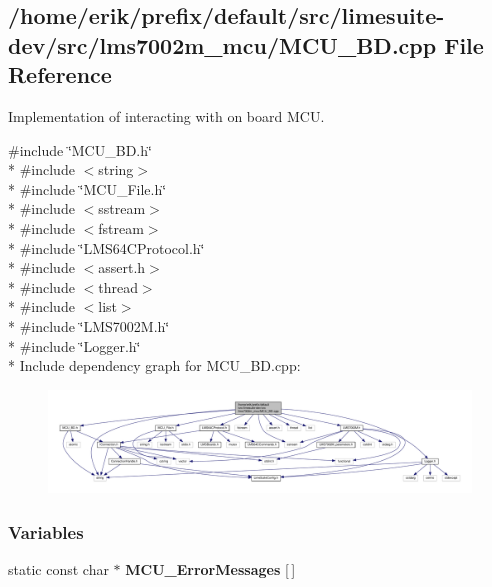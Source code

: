 \subsection{/home/erik/prefix/default/src/limesuite-\/dev/src/lms7002m\+\_\+mcu/\+M\+C\+U\+\_\+\+BD.cpp File Reference}
\label{MCU__BD_8cpp}


Implementation of interacting with on board M\+CU.  


{\ttfamily \#include \char`\"{}M\+C\+U\+\_\+\+B\+D.\+h\char`\"{}}\\*
{\ttfamily \#include $<$string$>$}\\*
{\ttfamily \#include \char`\"{}M\+C\+U\+\_\+\+File.\+h\char`\"{}}\\*
{\ttfamily \#include $<$sstream$>$}\\*
{\ttfamily \#include $<$fstream$>$}\\*
{\ttfamily \#include \char`\"{}L\+M\+S64\+C\+Protocol.\+h\char`\"{}}\\*
{\ttfamily \#include $<$assert.\+h$>$}\\*
{\ttfamily \#include $<$thread$>$}\\*
{\ttfamily \#include $<$list$>$}\\*
{\ttfamily \#include \char`\"{}L\+M\+S7002\+M.\+h\char`\"{}}\\*
{\ttfamily \#include \char`\"{}Logger.\+h\char`\"{}}\\*
Include dependency graph for M\+C\+U\+\_\+\+B\+D.\+cpp\+:
\nopagebreak
\begin{figure}[H]
\begin{center}
\leavevmode
\includegraphics[width=350pt]{d9/d35/MCU__BD_8cpp__incl}
\end{center}
\end{figure}
\subsubsection*{Variables}
\begin{DoxyCompactItemize}
\item 
static const char $\ast$ {\bf M\+C\+U\+\_\+\+Error\+Messages} [$\,$]
\end{DoxyCompactItemize}


